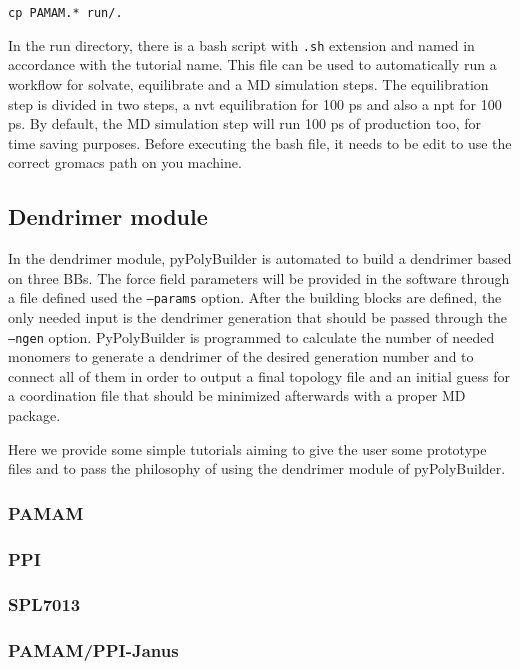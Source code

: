 \documentclass[12pt]{article}
\begin{document}
\begin{lstlisting}
cp PAMAM.* run/.
\end{lstlisting}

In the run directory, there is a bash script with \texttt{.sh} extension and named in accordance with the tutorial name.
This file can be used to automatically run a workflow for solvate, equilibrate and a MD simulation steps.
The equilibration step is divided in two steps, a nvt equilibration for 100 ps and also a npt for 100 ps.
By default, the MD simulation step will run 100 ps of production too, for time saving purposes.
Before executing the bash file, it needs to be edit to use the correct gromacs path on you machine.

\subsection{Dendrimer module}
In the dendrimer module, pyPolyBuilder is automated to build a dendrimer based on three BBs.
The force field parameters will be provided in the software through a file defined used the \texttt{--params} option.
After the building blocks are defined, the only needed input is the dendrimer generation that should be passed through the \texttt{--ngen} option.
PyPolyBuilder is programmed to calculate the number of needed monomers to generate a dendrimer of the desired generation number and to connect all of them in order to output a final topology file and an initial guess for a coordination file that should be minimized afterwards with a proper MD package.

Here we provide some simple tutorials aiming to give the user some prototype files and to pass the philosophy of using the dendrimer module of pyPolyBuilder.

\subsubsection{PAMAM}

\clearpage

\subsubsection{PPI}

\clearpage

\subsubsection{SPL7013}

\clearpage

\subsubsection{PAMAM/PPI-Janus}
\label{PAMAM/PPI-Janus}

\clearpage
\end{document}

